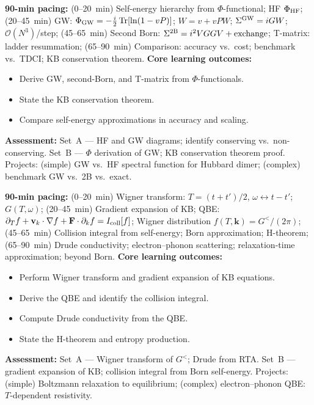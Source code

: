 \documentclass[11pt,a4paper]{article}
\begin{document}
\medskip

\begin{tcolorbox}[modulebox, title={Module~II.5 --- Lecture L06: Self-Energies and Conserving Approximations}]
\textbf{90-min pacing:} (0--20~min) Self-energy hierarchy from $\Phi$-functional; HF $\Phi_{\rm HF}$; (20--45~min) GW: $\Phi_{\rm GW}=-\tfrac{i}{2}\operatorname{Tr}[\ln(1-vP)]$; $W=v+vPW$; $\Sigma^{\rm GW}=iGW$; $\mathcal{O}(N^3)$/step; (45--65~min) Second Born: $\Sigma^{\rm 2B}=i^2VGGV+\text{exchange}$; T-matrix: ladder resummation; (65--90~min) Comparison: accuracy vs.\ cost; benchmark vs.\ TDCI; KB conservation theorem.
\medskip\textbf{Core learning outcomes:}
\begin{itemize}[leftmargin=1.4em,topsep=2pt,itemsep=1pt]
  \item Derive GW, second-Born, and T-matrix from $\Phi$-functionals.
  \item State the KB conservation theorem.
  \item Compare self-energy approximations in accuracy and scaling.
\end{itemize}
\medskip\textbf{Assessment:}
Set~A --- HF and GW diagrams; identify conserving vs.\ non-conserving.
Set~B --- $\Phi$ derivation of GW; KB conservation theorem proof.
Projects: (simple) GW vs.\ HF spectral function for Hubbard dimer; (complex) benchmark GW vs.\ 2B vs.\ exact.
\end{tcolorbox}

\medskip

\begin{tcolorbox}[modulebox, title={Module~II.5 --- Lecture L07: Quantum Boltzmann Equation}]
\textbf{90-min pacing:} (0--20~min) Wigner transform: $T=(t+t')/2$, $\omega\leftrightarrow t-t'$; $G(T,\omega)$; (20--45~min) Gradient expansion of KB; QBE: $\partial_T f+\mathbf{v}_k\cdot\nabla f+\mathbf{F}\cdot\partial_k f=I_{\rm coll}[f]$; Wigner distribution $f(T,\mathbf{k})=G^</(2\pi)$; (45--65~min) Collision integral from self-energy; Born approximation; H-theorem; (65--90~min) Drude conductivity; electron--phonon scattering; relaxation-time approximation; beyond Born.
\medskip\textbf{Core learning outcomes:}
\begin{itemize}[leftmargin=1.4em,topsep=2pt,itemsep=1pt]
  \item Perform Wigner transform and gradient expansion of KB equations.
  \item Derive the QBE and identify the collision integral.
  \item Compute Drude conductivity from the QBE.
  \item State the H-theorem and entropy production.
\end{itemize}
\medskip\textbf{Assessment:}
Set~A --- Wigner transform of $G^<$; Drude from RTA.
Set~B --- gradient expansion of KB; collision integral from Born self-energy.
Projects: (simple) Boltzmann relaxation to equilibrium; (complex) electron--phonon QBE: $T$-dependent resistivity.
\end{tcolorbox}
\end{document}
